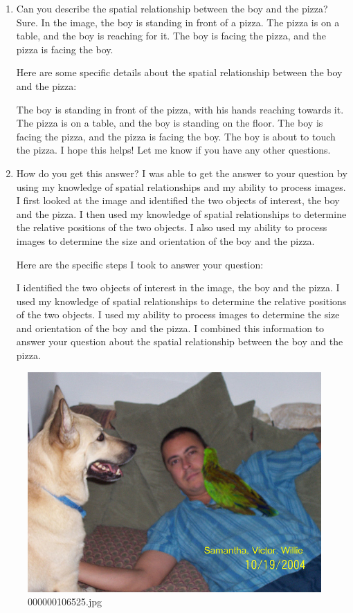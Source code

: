     \begin{enumerate}
        \item Can you describe the spatial relationship between the boy and the pizza?
        \subitem 
        Sure. In the image, the boy is standing in front of a pizza. The pizza is on a table, and the boy is reaching for it. The boy is facing the pizza, and the pizza is facing the boy.
        
        Here are some specific details about the spatial relationship between the boy and the pizza:
        
        The boy is standing in front of the pizza, with his hands reaching towards it.
        The pizza is on a table, and the boy is standing on the floor.
        The boy is facing the pizza, and the pizza is facing the boy.
        The boy is about to touch the pizza.
        I hope this helps! Let me know if you have any other questions.
        \item How do you get this answer?
        \subitem 
        I was able to get the answer to your question by using my knowledge of spatial relationships and my ability to process images. I first looked at the image and identified the two objects of interest, the boy and the pizza. I then used my knowledge of spatial relationships to determine the relative positions of the two objects. I also used my ability to process images to determine the size and orientation of the boy and the pizza.
        
        Here are the specific steps I took to answer your question:
        
        I identified the two objects of interest in the image, the boy and the pizza.
        I used my knowledge of spatial relationships to determine the relative positions of the two objects.
        I used my ability to process images to determine the size and orientation of the boy and the pizza.
        I combined this information to answer your question about the spatial relationship between the boy and the pizza.
    \end{enumerate}
    \begin{figure}[h]
        \centering
        \includegraphics[width=0.8\linewidth]{../image set/easy/000000106525.jpg}
        \caption{000000106525.jpg}
    \end{figure}
